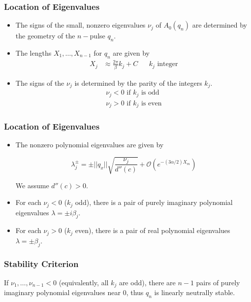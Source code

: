 \documentclass[16pt]{beamer}
\begin{document}
\begin{frame}
\frametitle{Location of Eigenvalues}
	\begin{itemize}
		\item The signs of the small, nonzero eigenvalues $\nu_j$ of $A_0(q_n)$ are determined by the geometry of the $n-$pulse $q_n$.

		\item The lengths $X_1, \dots, X_{n-1}$ for $q_n$ are given by
		\begin{align*}
		X_j &\approx \frac{2\pi}{\beta} k_j + C && k_j \text{ integer}
	    \end{align*}

    	\item The signs of the $\nu_j$ is determined by the parity of the integers $k_j$. 
        \begin{align*}
            \nu_j < 0 \text{ if } k_j \text{ is odd} \\
            \nu_j > 0 \text{ if } k_j \text{ is even} 
        \end{align*}
	\end{itemize}
\end{frame}

\begin{frame}
\frametitle{Location of Eigenvalues}
	\begin{itemize}
		\item The nonzero polynomial eigenvalues are given by

		\begin{equation*}
      		\lambda_j^\pm = \pm ||q_x|| \sqrt{ \frac{\nu_j}{d''(c)} } + \mathcal{O}(e^{-(3 \alpha/2) X_m})
      	\end{equation*}

      	We assume $d''(c) > 0$.

        \item For each $\nu_j < 0$ ($k_j$ odd), there is a pair of purely imaginary polynomial eigenvalues $\lambda = \pm i \beta_j$.

        \item For each $\nu_j > 0$ ($k_j$ even), there is a pair of real polynomial eigenvalues $\lambda = \pm \beta_j$.
	\end{itemize}
\end{frame}

\begin{frame}
\frametitle{Stability Criterion}
\begin{corollary}[Kapitula et. al., 2019]If $\nu_1, \dots, \nu_{n-1} < 0$ (equivalently, all $k_j$ are odd), there are $n - 1$ pairs of purely imaginary polynomial eigenvalues near 0, thus $q_n$ is linearly neutrally stable.
\end{corollary}
\end{frame}
\end{document}

